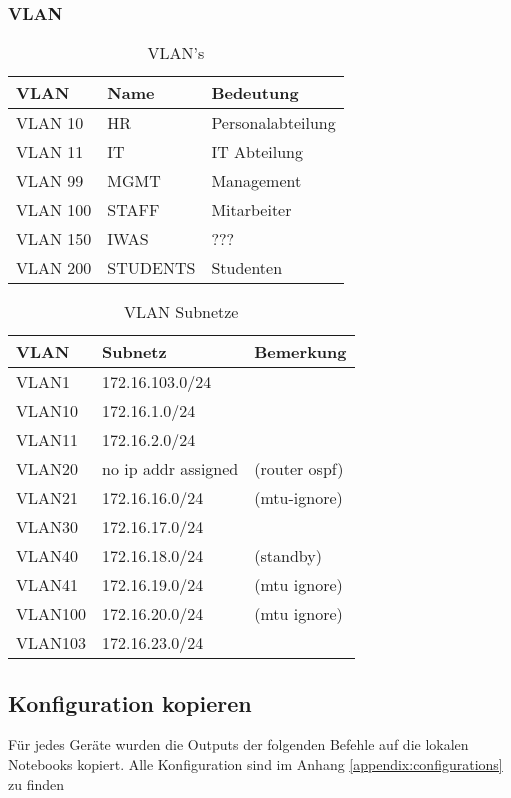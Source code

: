 \subsubsection{VLAN}
\begin{table}[h]
	\centering
	\begin{tabu} to \linewidth {l l l}
		\toprule 
		VLAN & Name & Bedeutung \\
		\midrule
		VLAN 10 & HR & Personalabteilung \\
		VLAN 11 & IT & IT Abteilung \\
		VLAN 99 & MGMT & Management\\
		VLAN 100 & STAFF & Mitarbeiter\\
		VLAN 150 & IWAS & ???\\
		VLAN 200 & STUDENTS & Studenten\\
		\bottomrule 
	\end{tabu} 
	\caption{VLAN's}
\end{table}

\begin{table}[h]
	\centering
	\begin{tabu} to \linewidth {l l l}
		\toprule 
		VLAN & Subnetz & Bemerkung \\
		\midrule
		VLAN1 & 172.16.103.0/24 & \\
		VLAN10 & 172.16.1.0/24 & \\
		VLAN11 & 172.16.2.0/24 & \\
		VLAN20 & no ip addr assigned & (router ospf) \\
		VLAN21 & 172.16.16.0/24 & (mtu-ignore) \\
		VLAN30 & 172.16.17.0/24 & \\
		VLAN40 & 172.16.18.0/24 & (standby) \\
		VLAN41 & 172.16.19.0/24 & (mtu ignore) \\
		VLAN100 & 172.16.20.0/24 & (mtu ignore) \\
		VLAN103 & 172.16.23.0/24 & \\
		\bottomrule 
	\end{tabu} 
	\caption{VLAN Subnetze}
\end{table}

\subsection{Konfiguration kopieren}
Für jedes Geräte wurden die Outputs der folgenden Befehle auf die lokalen Notebooks kopiert. Alle Konfiguration sind im Anhang \ref{appendix:configurations} zu finden

